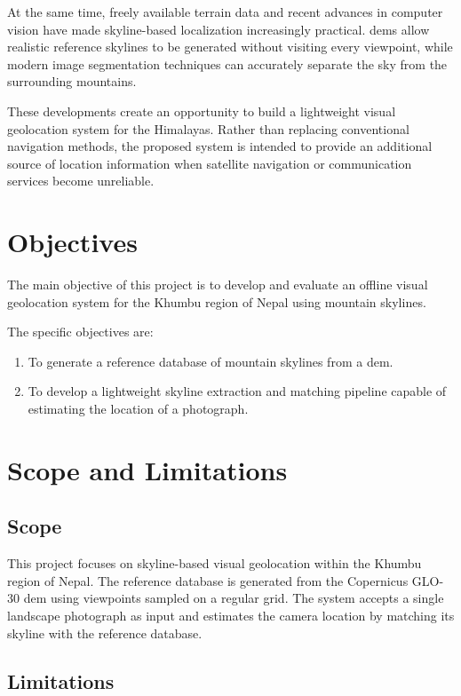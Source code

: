 At the same time, freely available terrain data and recent advances in computer vision have made skyline-based localization increasingly practical. \Glspl{dem} allow realistic reference skylines to be generated without visiting every viewpoint, while modern image segmentation techniques can accurately separate the sky from the surrounding mountains.

These developments create an opportunity to build a lightweight visual geolocation system for the Himalayas. Rather than replacing conventional navigation methods, the proposed system is intended to provide an additional source of location information when satellite navigation or communication services become unreliable.

\section{Objectives}

The main objective of this project is to develop and evaluate an offline visual geolocation system for the Khumbu region of Nepal using mountain skylines.

The specific objectives are:

\begin{enumerate}
    \item To generate a reference database of mountain skylines from a \Gls{dem}.
    \item To develop a lightweight skyline extraction and matching pipeline capable of estimating the location of a photograph.
\end{enumerate}

\section{Scope and Limitations}

\subsection{Scope}

This project focuses on skyline-based visual geolocation within the Khumbu region of Nepal. The reference database is generated from the Copernicus GLO-30 \Gls{dem} using viewpoints sampled on a regular grid. The system accepts a single landscape photograph as input and estimates the camera location by matching its skyline with the reference database.

\subsection{Limitations}

